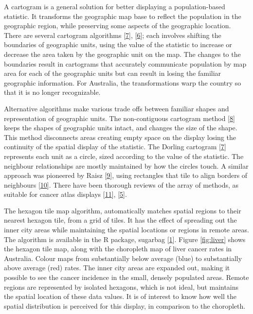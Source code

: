 \documentclass[conference,final,]{IEEEtran}
\begin{document}
A cartogram is a general solution for better displaying a population-based statistic. It transforms the geographic map base to reflect the population in the geographic region, while preserving some aspects of the geographic location. There are several cartogram algorithms {[}\protect\hyperlink{ref-ACTUC}{7}{]}, {[}\protect\hyperlink{ref-CBATCC}{6}{]}; each involves shifting the boundaries of geographic units, using the value of the statistic to increase or decrease the area taken by the geographic unit on the map. The changes to the boundaries result in cartograms that accurately communicate population by map area for each of the geographic units but can result in losing the familiar geographic information. For Australia, the transformations warp the country so that it is no longer recognizable.

Alternative algorithms make various trade offs between familiar shapes and representation of geographic units. The non-contiguous cartogram method {[}\protect\hyperlink{ref-NAC}{8}{]} keeps the shapes of geographic units intact, and changes the size of the shape. This method disconnects areas creating empty space on the display losing the continuity of the spatial display of the statistic. The Dorling cartogram {[}\protect\hyperlink{ref-ACTUC}{7}{]} represents each unit as a circle, sized according to the value of the statistic. The neighbour relationships are mostly maintained by how the circles touch. A similar approach was pioneered by Raisz {[}\protect\hyperlink{ref-RSCW}{9}{]}, using rectangles that tile to align borders of neighbours {[}\protect\hyperlink{ref-CDWCS}{10}{]}. There have been thorough reviews of the array of methods, as suitable for cancer atlas displays {[}\protect\hyperlink{ref-review}{11}{]}, {[}\protect\hyperlink{ref-BCM}{5}{]}.

The hexagon tile map algorithm, automatically matches spatial regions to their nearest hexagon tile, from a grid of tiles. It has the effect of spreading out the inner city areas while maintaining the spatial locations or regions in remote areas. The algorithm is available in the R package, sugarbag {[}\protect\hyperlink{ref-sugarbag}{1}{]}. Figure \ref{fig:liver} shows the hexagon tile map, along with the choropleth map of liver cancer rates in Australia. Colour maps from substantially below average (blue) to substantially above average (red) rates. The inner city areas are expanded out, making it possible to see the cancer incidence in the small, densely populated areas. Remote regions are represented by isolated hexagons, which is not ideal, but maintains the spatial location of these data values. It is of interest to know how well the spatial distribution is perceived for this display, in comparison to the choropleth.
\end{document}
